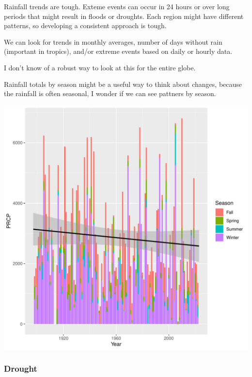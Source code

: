 \documentclass{article}
\begin{document}
\begin{itemize}
Rainfall trends are tough. Exteme events can occur in 24 hours or over long periods that might result in floods or droughts. Each region might have different patterns, so developing a consistent approach is tough.

We can look for trends in monthly averages, number of days without rain (important in tropics), and/or extreme events based on daily or hourly data. 

I don't know of a robust way to look at this for the entire globe. 



Rainfall totals by season might be a useful way to think about changes, because the rainfall is often seasonal, I wonder if we can see pattners by season. 

\begin{knitrout}
\color{fgcolor}\begin{kframe}


{\ttfamily\noindent\itshape{}}\end{kframe}
\includegraphics[width=\maxwidth]{figure/unnamed-chunk-9-1} 
\end{knitrout}

\subsubsection{Drought}


\end{itemize}
\end{document}
